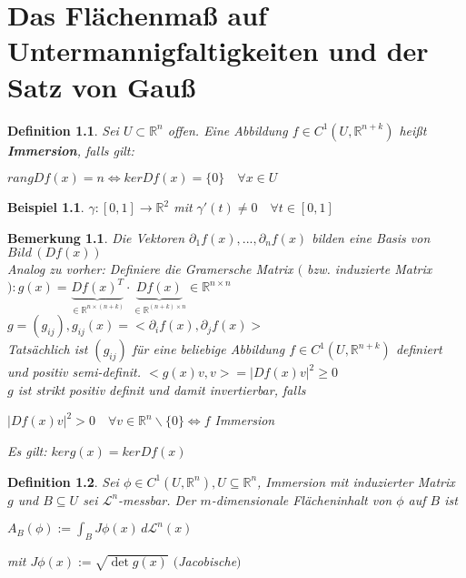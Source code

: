 \documentclass[11pt]{memoir}
\theoremstyle{changebreak}
\newtheorem{Definition}{Definition}[chapter]
\newtheorem{Bemerkung}{Bemerkung}[chapter]
\newtheorem{Beispiel}{Beispiel}[chapter]
\begin{document}
\chapter{Das Flächenmaß auf Untermannigfaltigkeiten und der Satz von Gauß}

\begin{Definition}
Sei $U \subset \mathbb R^n$ offen. Eine Abbildung $f \in C^1(U, \mathbb R^{n+k})$ heißt \textbf{Immersion}, falls gilt:
\begin{center}
	$ rang D f(x) = n \Leftrightarrow ker D f(x) = \{0\}\quad \forall x \in U$
\end{center}
\end{Definition}

\begin{Beispiel}
$\gamma: [0, 1] \rightarrow \mathbb R^2$ mit $\gamma'(t) \ne 0\quad \forall t \in [0,1]$
\end{Beispiel}

\begin{Bemerkung}
Die Vektoren $\partial_1 f(x), ..., \partial_n f(x)$ bilden eine Basis von $Bild\,(Df(x))$ \\
Analog zu vorher: Definiere die Gramersche Matrix $($ bzw. induzierte Matrix$): g(x) = \underbrace{Df(x)^T}_{\in \mathbb R^{n \times (n+k)}}\cdotp \underbrace{Df(x)}_{\in \mathbb R^{(n+k) \times n}} \in \mathbb R^{n\times n}$ \\
$g= (g_{ij}), g_{ij}(x) = <\partial_i f(x), \partial_j f(x)>$ \\
Tatsächlich ist $(g_{ij})$ für eine beliebige Abbildung $f \in C^1(U, \mathbb R^{n+k})$ definiert und positiv semi-definit. $<g(x)v, v> = |Df(x)v|^2 \geq 0$ \\
$g$ ist strikt positiv definit und damit invertierbar, falls
\begin{center}
	$|Df(x)v|^2 > 0\quad \forall v \in \mathbb R^n \backslash \{0\} \Leftrightarrow f$ Immersion
\end{center}
Es gilt: $ker g(x) = ker Df(x)$
\end{Bemerkung}

\begin{Definition}
Sei $\phi \in C^1(U, \mathbb R^n), U \subseteq \mathbb R^n$, Immersion mit induzierter Matrix $g$ und $B \subseteq U$ sei $\mathscr L^n$-messbar. Der $m$-dimensionale Flächeninhalt von $\phi$ auf $B$ ist
\begin{center}
	$A_B(\phi) := \int_B J \phi(x) \, d \mathscr L^n(x)$
\end{center}
mit $J\phi(x) := \sqrt{\det g(x)}$ $($Jacobische$)$
\end{Definition}
\end{document}
